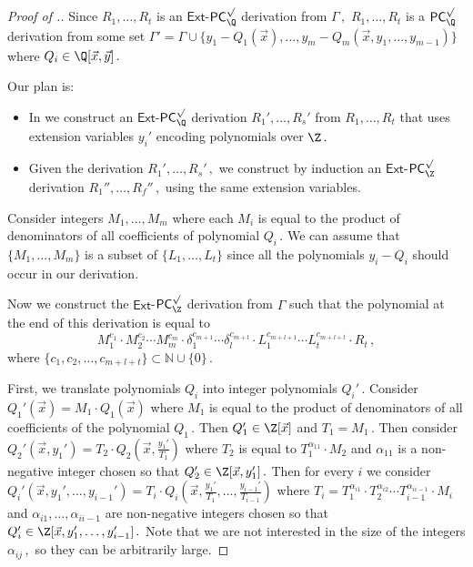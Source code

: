 \documentclass{toc}
\begin{document}
\begin{proof}[Proof of .]
Since %
$R_1, \ldots, R_t$ %
is an $\mathsf{Ext}$-$\mathsf{PC}^{\surd}_{\Q}$ derivation from %
$\Gamma\,,$ %
%
$R_1, \ldots, R_t$ %
is a $\mathsf{PC}_{\Q}^{\surd}$ derivation from some set $\Gamma' = \Gamma \cup \{y_1 - Q_1(\vec x), \ldots, y_m - Q_m(\vec x, y_1, \ldots, y_{m - 1})\}$ where  %
$Q_i \in \Q[\vec x, \vec y]\,.$ %

Our plan is:
\begin{itemize}
	\item In  we construct an $\mathsf{Ext}$-$\mathsf{PC}^{\surd}_{\Q}$ derivation  
%
$R_1', \ldots, R_s'$ %
 from %
$R_1, \ldots, R_t$ %
that uses extension variables $y_i'$ encoding polynomials over %
$\Z\,.$ %
%
	\item Given the derivation  %
$R_1', \ldots, R_s'\,,$ %
 we construct by induction an $\mathsf{Ext}$-$\mathsf{PC}^{\surd}_{\Z}$ derivation  %
$R_1'', \ldots, R_f''\,,$ %
 using the same extension variables.
\end{itemize}

%
Consider integers $M_1, \ldots, M_m$ where each $M_i$ is equal to the product of denominators of all coefficients of polynomial %
$Q_i\,.$ %
 We can assume that $\{M_1, \ldots, M_m\}$ is a subset of $\{L_1, \ldots, L_t\}$ since all the polynomials $y_i - Q_i$ should occur in our derivation. %



%
Now we construct the $\mathsf{Ext}$-$\mathsf{PC}^{\surd}_{\Z}$ derivation from $\Gamma$ such that the polynomial at %
the end of this derivation is equal to 
$$
%
M_1^{c_1} \cdot M_2^{c_2} \cdots M_m^{c_m} \cdot \delta_1^{c_{m + 1}} \cdots \delta_l^{c_{m + l}} \cdot  L_1^{c_{m + l + 1}} \cdots L_t^{c_{m + l + t}}  \cdot R_t\,, %
$$
where %
$\{c_1, c_2, \ldots, c_{m + l + t}\} \subset \mathbb{N} \cup \{0\}\,.$ %
 
%
First, we translate polynomials $Q_i$ into integer polynomials %
$Q_i'\,.$ %
 Consider $Q_1'(\vec x) = M_1 \cdot Q_1(\vec x)$ where $M_1$ is equal to the product of denominators of all coefficients of the polynomial %
$Q_1\,.$ %
 Then $Q_1' \in \Z[\vec x]$ and %
$T_1 = M_1\,.$ %
 Then consider $Q_2' (\vec x, y_1') = T_2 \cdot Q_2 (\vec x, \frac{y_1'}{T_1})$ where $T_2$ is equal to $T_1^{\alpha_{1 1}} \cdot M_2$ and $\alpha_{1 1}$ is a non-negative integer chosen so that %
$Q_2' \in \Z[\vec x, y_1']\,.$ %
 Then for every $i$ we consider $Q_i'(\vec x, y_1', \ldots, y_{i - 1}') = T_i \cdot Q_{i}(\vec x, \frac{y_1'}{T_1}, \ldots, \frac{y_{i - 1}'}{T_{i - 1}})$ where $T_i = T_1^{\alpha_{i 1}} \cdot T_2^{\alpha_{i 2}} \cdots T_{i - 1}^{\alpha_{i i - 1}} \cdot M_i$ and $\alpha_{i 1}, \ldots, \alpha_{i i - 1}$ are non-negative integers chosen so that %
$Q_{i}' \in \Z[\vec x, y_1', \ldots, y_{i - 1}']\,.$ %
 Note that we are not interested in the size of the integers %
$\alpha_{i j}\,,$ %
 so they can be arbitrarily large. %


\end{proof}
\end{document}

